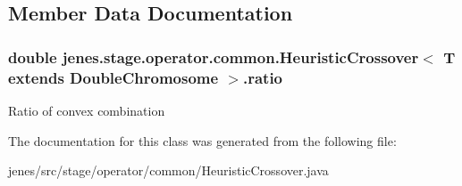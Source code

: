 \subsection{Member Data Documentation}
\hypertarget{classjenes_1_1stage_1_1operator_1_1common_1_1_heuristic_crossover_3_01_t_01extends_01_double_chromosome_01_4_a9cae7cf20e3154743a4dbe53054f513b}{
\subsubsection[{ratio}]{\setlength{\rightskip}{0pt plus 5cm}double jenes.\-stage.\-operator.\-common.\-Heuristic\-Crossover$<$ T extends {\bf Double\-Chromosome} $>$.ratio\hspace{0.3cm}{\ttfamily [protected]}}}\label{classjenes_1_1stage_1_1operator_1_1common_1_1_heuristic_crossover_3_01_t_01extends_01_double_chromosome_01_4_a9cae7cf20e3154743a4dbe53054f513b}
Ratio of convex combination 

The documentation for this class was generated from the following file\-:\begin{DoxyCompactItemize}
\item 
jenes/src/stage/operator/common/Heuristic\-Crossover.\-java\end{DoxyCompactItemize}
